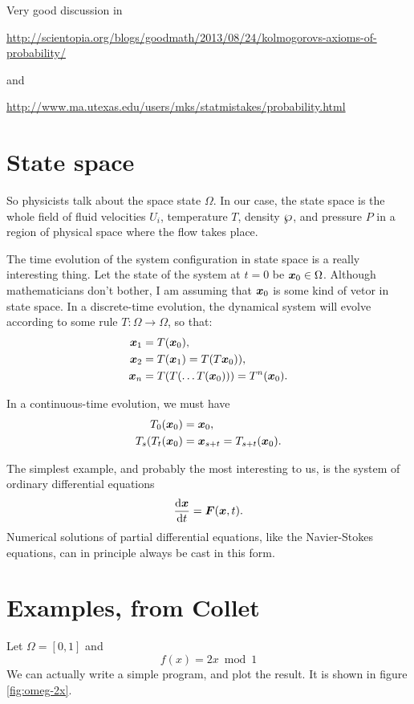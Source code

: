 \documentclass[12pt]{article}
\begin{document}
Very good discussion in
\begin{center}
\url{http://scientopia.org/blogs/goodmath/2013/08/24/kolmogorovs-axioms-of-probability/}
\end{center}

and

\url{http://www.ma.utexas.edu/users/mks/statmistakes/probability.html}


\section{State space}

So physicists talk about the space state $\Omega$. In our case, the state space
is the whole field of fluid velocities $U_i$, temperature $T$, density $\Rho$,
and pressure $P$ in a region of physical space where the flow takes place.

The time evolution of the system configuration in state space is a really
interesting thing.  Let the state of the system at $t=0$ be $\boldsymbol{x}_0 \in
\Omega$. Although mathematicians don't bother, I am assuming that $\boldsymbol{x}_0$ is some
kind of vetor in state space. In a discrete-time evolution, the dynamical system
will evolve according to some rule $T: \Omega \rightarrow \Omega$, so that:
\begin{align*}
\boldsymbol{x}_1 &= T(\boldsymbol{x}_0),\\
\boldsymbol{x}_2 &= T(\boldsymbol{x}_1) = T(T\boldsymbol{x}_0)), \\
\boldsymbol{x}_n &= T(T(\ldots T(\boldsymbol{x}_0))) = T^n(\boldsymbol{x}_0).
\end{align*}

In a continuous-time evolution, we must have
\begin{align*}
T_0(\boldsymbol{x}_0) &= \boldsymbol{x}_0, \\
T_s(T_t(\boldsymbol{x}_0) &= \boldsymbol{x}_{s+t} = T_{s+t}(\boldsymbol{x}_0).
\end{align*}

The simplest example, and probably the most interesting to us, is the system of
ordinary differential equations
\[
\frac{\mathrm{d}{\boldsymbol{x}}}{\mathrm{d}{t}} = \boldsymbol{F}(\boldsymbol{x},t).
\]
Numerical solutions of partial differential equations, like the Navier-Stokes
equations, can in principle always be cast in this form.

\section{Examples, from  Collet}

Let $\Omega = [0,1]$ and 
\begin{equation}
f(x) = 2x \bmod 1 \label{eq:omeg-2x}
\end{equation}
We can actually write a simple program, and plot the result.  It is shown in
figure \ref{fig:omeg-2x}.
\end{document}
